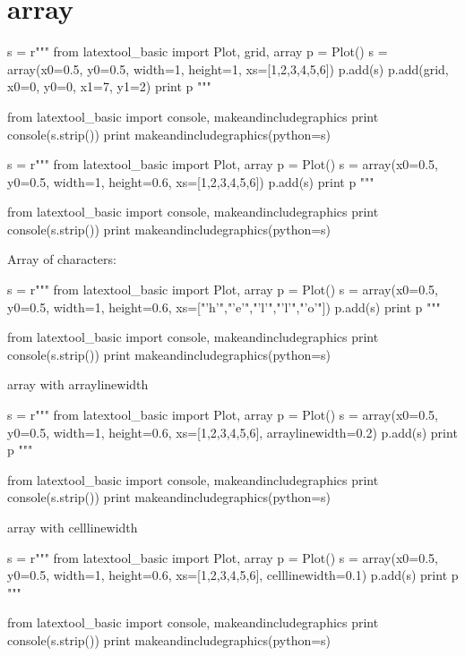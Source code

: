 \section{array}

\begin{python}
s = r"""
from latextool_basic import Plot, grid, array
p = Plot()
s = array(x0=0.5, y0=0.5, width=1, height=1, xs=[1,2,3,4,5,6])
p.add(s)
p.add(grid, x0=0, y0=0, x1=7, y1=2)
print p
"""

from latextool_basic import console, makeandincludegraphics
print console(s.strip())
print makeandincludegraphics(python=s)
\end{python}




\begin{python}
s = r"""
from latextool_basic import Plot, array
p = Plot()
s = array(x0=0.5, y0=0.5, width=1, height=0.6, xs=[1,2,3,4,5,6])
p.add(s)
print p
"""

from latextool_basic import console, makeandincludegraphics
print console(s.strip())
print makeandincludegraphics(python=s)
\end{python}




Array of characters:
\begin{python}
s = r"""
from latextool_basic import Plot, array
p = Plot()
s = array(x0=0.5, y0=0.5, width=1, height=0.6, 
          xs=["'h'","'e'","'l'","'l'","'o'"])
p.add(s)
print p
"""

from latextool_basic import console, makeandincludegraphics
print console(s.strip())
print makeandincludegraphics(python=s)
\end{python}




array with arraylinewidth
\begin{python}
s = r"""
from latextool_basic import Plot, array
p = Plot()
s = array(x0=0.5, y0=0.5, width=1, height=0.6, 
          xs=[1,2,3,4,5,6],
          arraylinewidth=0.2)
p.add(s)
print p
"""

from latextool_basic import console, makeandincludegraphics
print console(s.strip())
print makeandincludegraphics(python=s)
\end{python}



array with celllinewidth
\begin{python}
s = r"""
from latextool_basic import Plot, array
p = Plot()
s = array(x0=0.5, y0=0.5, width=1, height=0.6, 
          xs=[1,2,3,4,5,6],
          celllinewidth=0.1)
p.add(s)
print p
"""

from latextool_basic import console, makeandincludegraphics
print console(s.strip())
print makeandincludegraphics(python=s)
\end{python}

